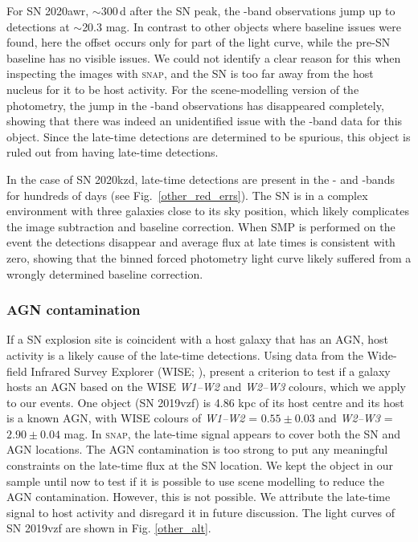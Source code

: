 \documentclass[a4paper,oneside,12pt, class=Latex/Classes/PhDthesisPSnPDF, crop=false]{standalone}
\begin{document}
For SN 2020awr, $\sim$300\,d after the SN peak, the \ztfi-band observations jump up to detections at $\sim$20.3 mag. In contrast to other objects where baseline issues were found, here the offset occurs only for part of the light curve, while the pre-SN baseline has no visible issues. We could not identify a clear reason for this when inspecting the images with \textsc{snap}, and the SN is too far away from the host nucleus for it to be host activity. For the scene-modelling version of the photometry, the jump in the \ztfi-band observations has disappeared completely, showing that there was indeed an unidentified issue with the \ztfi-band data for this object. Since the late-time detections are determined to be spurious, this object is ruled out from having late-time detections.

In the case of SN 2020kzd, late-time detections are present in the \ztfg- and \ztfr-bands for hundreds of days (see Fig.~\ref{other_red_errs}). The SN is in a complex environment with three galaxies close to its sky position, which likely complicates the image subtraction and baseline correction. When SMP is performed on the event the detections disappear and average flux at late times is consistent with zero, showing that the binned forced photometry light curve likely suffered from a wrongly determined baseline correction.

\subsubsection{AGN contamination}
\label{sec:agn_cont}
If a SN explosion site is coincident with a host galaxy that has an AGN, host activity is a likely cause of the late-time detections. Using data from the Wide-field Infrared Survey Explorer (WISE; \citealt{WISE}), \citet{WISE_crit} present a criterion to test if a galaxy hosts an AGN based on the WISE \textit{W1--W2} and \textit{W2--W3} colours, which we apply to our events. One object (SN 2019vzf) is 4.86 kpc of its host centre and its host is a known AGN, with WISE colours of \textit{W1--W2} = $0.55\pm0.03$ and \textit{W2--W3} = $2.90\pm0.04$ mag. In \textsc{snap}, the late-time signal appears to cover both the SN and AGN locations. The AGN contamination is too strong to put any meaningful constraints on the late-time flux at the SN location. We kept the object in our sample until now to test if it is possible to use scene modelling to reduce the AGN contamination. However, this is not possible. We attribute the late-time signal to host activity and disregard it in future discussion. The light curves of SN 2019vzf are shown in Fig. \ref{other_alt}.
\end{document}
